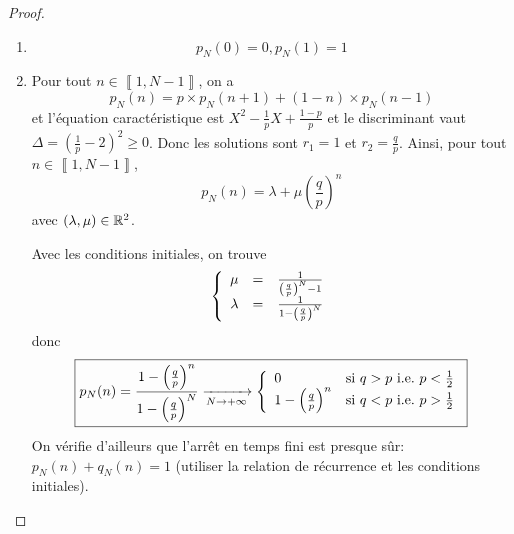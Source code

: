\documentclass[12pt]{article}
\begin{document}
\begin{proof}
    \phantom{}
    \begin{enumerate}
        \item 
        \begin{equation}
            \boxed{p_{N}(0)=0,p_{N}(1)=1}    
        \end{equation}

        \item Pour tout $n\in\left\llbracket 1,N-1\right\rrbracket$, on a 
        \begin{equation}
            p_{N}(n)=p\times p_{N}(n+1)+(1-n)\times p_{N}(n-1)
        \end{equation}
        et l'équation caractéristique est $X^{2}-\frac{1}{p}X+\frac{1-p}{p}$ et le discriminant vaut $\Delta=\left(\frac{1}{p}-2\right)^{2}\geqslant0$. Donc les solutions sont $r_{1}=1$ et $r_{2}=\frac{q}{p}$. Ainsi, pour tout $n\in\left\llbracket 1,N-1\right\rrbracket$,
        \begin{equation}
            p_{N}(n)=\lambda+\mu\left(\frac{q}{p}\right)^{n}
        \end{equation}
        avec $\left(\lambda,\mu\right)\in\mathbb{R}^{2}$.
        
        Avec les conditions initiales, on trouve 
        \begin{equation}
            \left\{
                \begin{array}[]{rcl}
                    \mu &= &\frac{1}{\left(\frac{q}{p}\right)^{N}-1}\\
                    \lambda &= &\frac{1}{1-\left(\frac{q}{p}\right)^{N}}
                \end{array}
            \right.
        \end{equation}
        donc 
        \begin{equation}
            \boxed{
            p_{N}(n)=\frac{1-\left(\frac{q}{p}\right)^{n}}{1-\left(\frac{q}{p}\right)^{N}}\xrightarrow[N\to+\infty]{}
            \left\{
                \begin{array}[]{ll}
                    0 &\text{si }q>p\text{ i.e.~}p<\frac{1}{2}\\
                    1-\left(\frac{q}{p}\right)^{n} &\text{si }q<p\text{ i.e.~}p>\frac{1}{2}
                \end{array}
            \right.}
        \end{equation}
        On vérifie d'ailleurs que l'arrêt en temps fini est presque sûr: $p_{N}(n)+q_{N}(n)=1$ (utiliser la relation de récurrence et les conditions initiales).
    \end{enumerate}
\end{proof}
\end{document}
